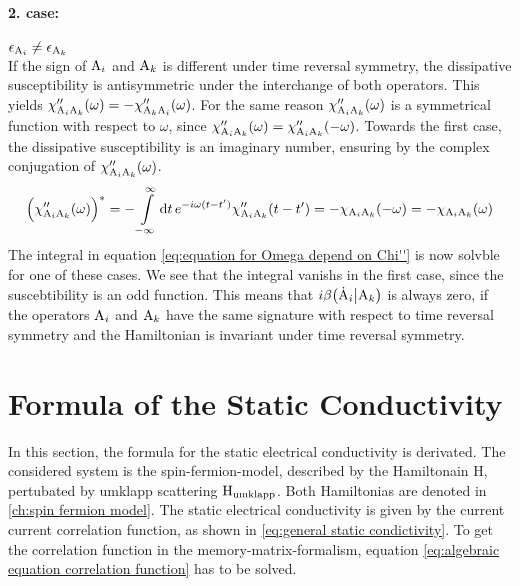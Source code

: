\paragraph{2. case:} $\epsilon_{\mathrm{A}_{i}} \neq \epsilon_{\mathrm{A}_{k}}$\\
%
If the sign of $\mathrm{A}_{i}$ and $\mathrm{A}_{k}$ is different under time reversal symmetry, the dissipative susceptibility is antisymmetric under the interchange of both operators.
This yields $\chi''_{\mathrm{A}_{i} \mathrm{A}_{k}}(\omega) = -\chi''_{\mathrm{A}_{k} \mathrm{A}_{i}}(\omega)$.
For the same reason $\chi''_{\mathrm{A}_{i} \mathrm{A}_{k}}(\omega)$ is a symmetrical function with respect to $\omega$, since $\chi''_{\mathrm{A}_{i} \mathrm{A}_{k}}(\omega) = \chi''_{\mathrm{A}_{i} \mathrm{A}_{k}}(-\omega)$.
Towards the first case, the dissipative susceptibility is an imaginary number, ensuring by the complex conjugation of $\chi''_{\mathrm{A}_{i} \mathrm{A}_{k}}(\omega)$.
%
\begin{align}
	\Big(\chi''_{\mathrm{A}_{i} \mathrm{A}_{k}}(\omega)\Big)^{*} = -\int\limits_{-\infty}^{\infty} \dd{t} e^{-i\omega(t-t')} \chi''_{\mathrm{A}_{i} \mathrm{A}_{k}}(t-t') = -\chi_{\mathrm{A}_{i} \mathrm{A}_{k}}(-\omega) = -\chi_{\mathrm{A}_{i} \mathrm{A}_{k}}(\omega)
\end{align}
%
The integral in equation \eqref{eq:equation for Omega depend on Chi''} is now solvble for one of these cases.
We see that the integral vanishs in the first case, since the suscebtibility is an odd function.
This means that $i \beta \big({\dot{\mathrm{A}}_{i}}\big|{\mathrm{A}_{k}}\big)$ is always zero, if the operators $\mathrm{A}_{i}$ and $\mathrm{A}_{k}$ have the same signature with respect to time reversal symmetry and the Hamiltonian is invariant under time reversal symmetry.

%
%
\section{Formula of the Static Conductivity}
\label{sec:formula static conductivity}
%
%
In this section, the formula for the static electrical conductivity is derivated.
The considered system is the spin-fermion-model, described by the Hamiltonain H, pertubated by umklapp scattering $\mathrm{H}_{\mathrm{umklapp}}$.
Both Hamiltonias are denoted in \ref{ch:spin fermion model}.
The static electrical conductivity is given by the current current correlation function, as shown in \eqref{eq:general static condictivity}.
To get the correlation function in the memory-matrix-formalism, equation \eqref{eq:algebraic equation correlation function} has to be solved.


